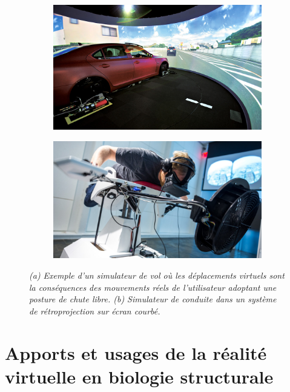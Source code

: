 \begin{figure}[h]
  \begin{subfigure}{.5\textwidth}
  \centering
  {\includegraphics[width=0.9\linewidth]{./figures/ch3/driving_simu}}
    \caption{}
    \label{Fig:driving_simu}
  \end{subfigure}
  \begin{subfigure}{.5\textwidth}
  \centering
  {\includegraphics[width=0.9\linewidth]{./figures/ch3/flight_simu}}
    \caption{}
    \label{Fig:flight_simu}
  \hspace{0.3cm}
  \end{subfigure}
  \caption[(a) Exemple d'un simulateur de vol. (b) Exemple d'un simulateur de conduite.]{\it(a) Exemple d'un simulateur de vol où les déplacements virtuels sont la conséquences des mouvements réels de l'utilisateur adoptant une posture de chute libre.
  (b) Simulateur de conduite dans un système de rétroprojection sur écran courbé.
  }
\end{figure}



\section{Apports et usages de la réalité virtuelle en biologie structurale} \label{RV_for_bio_struct}

